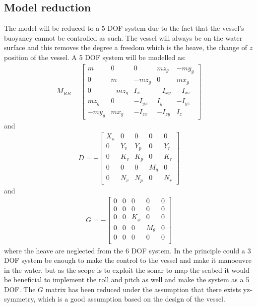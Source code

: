 \subsection{Model reduction}
The model will be reduced to a 5 \ac{DOF} system due to the fact that the
vessel's buoyancy cannot be controlled as such. The vessel will always
be on the water surface and this removes the degree a freedom which
is the heave, the change of $z$ position of the vessel. A 5 \ac{DOF}
system will be modelled as:
\begin{align}
M_{RB} =
\begin{bmatrix}
m & 0 & 0 & mz_g & -my_g\\
0 & m & -mz_g & 0 & mx_g\\
0 & -mz_g & I_x & -I_{xy} & -I_{xz}\\
mz_g & 0 & -I_{yx} & I_y & -I_{yz}\\
-my_g & mx_g & -I_{zx} & -I_{zy} & I_z
\end{bmatrix}
\label{eq:rigidbody}
\end{align}
and
\begin{align}
D = -
\begin{bmatrix}
X_u & 0 & 0 & 0 & 0\\
0 & Y_v & Y_p & 0 & Y_r\\
0 & K_v & K_p & 0 & K_r\\
0 & 0 & 0 & M_q & 0\\
0 & N_v & N_p & 0 & N_r
\end{bmatrix}
\label{eq:damping-matrix}
\end{align}
and
\begin{align}
G = -
\begin{bmatrix}
0 & 0 & 0 & 0 & 0\\
0 & 0 & 0 & 0 & 0\\
0 & 0 & K_\phi & 0 & 0\\
0 & 0 & 0 & M_\theta & 0\\
0 & 0 & 0 & 0 & 0\\
\end{bmatrix}
\label{eq:restoreforce}
\end{align}
where the heave are neglected from the 6 \ac{DOF} system. In the principle could a 3 \ac{DOF} system be enough to make the control to the vessel and make it manoeuvre in the water, but as the scope is to exploit the sonar to map the seabed it would be beneficial to implement the roll and pitch as well and make the system as a 5 \ac{DOF}. The $G$ matrix has been reduced under the assumption that there exists yz-symmetry, which is a good assumption based on the design of the vessel.

